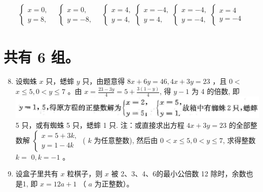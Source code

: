 \documentclass[10pt]{article}
\begin{document}
\begin{align*}
\left\{\begin{array} { l } 
{ x = 0 , } \\
{ y = 8 , }
\end{array} \quad \left\{\begin{array} { l } 
{ x = 0 , } \\
{ y = - 8 , }
\end{array} \quad \left\{\begin{array} { l } 
{ x = 4 , } \\
{ y = 4 , }
\end{array} \left\{\begin{array} { l } 
{ x = - 4 , } \\
{ y = 4 , }
\end{array} \left\{\begin{array} { l } 
{ x = - 4 , } \\
{ y = - 4 , }
\end{array} \left\{\begin{array}{l}
x=4 \\
y=-4
\end{array}\right.\right.\right.\right.\right.\right.
\end{align*}

\section*{共有 6 组。}
\begin{enumerate}
  \setcounter{enumi}{7}
  \item 设蜘蛛 $x$ 只，蟋蟀 $y$ 只，由题意得 $8 x+6 y=46,4 x+3 y=23$ ，且 $0<$ $x \leqslant 5,0<y \leqslant 7$ 。由 $x=\frac{23-3 y}{4}=5+\frac{3(1-y)}{4}$, 得 $y-1$ 为 4 的倍数, 即\\
\includegraphics[max width=\textwidth]{2024_10_30_26b590fd1106d28139f0g-145} 5 只，或有蜘蛛 5 只，蟋蟀 1 只. 注：或直接求出方程 $4 x+3 y=23$ 的全部整数解 $\left\{\begin{array}{l}x=5+3 k, \\ y=1-4 k\end{array}\right.$ ( $k$ 为任意整数), 然后由 $0<x \leqslant 5,0<y \leqslant 7$, 求得整数 $k=$ $0, k=-1$ 。
  \item 设盒子里共有 $x$ 粒棋子，则 $x$ 被 2、3、4、6的最小公倍数 12 除时，余数也是1, 即 $x=12 a+1$ （ $a$ 为正整数）。
\end{enumerate}
\end{document}
